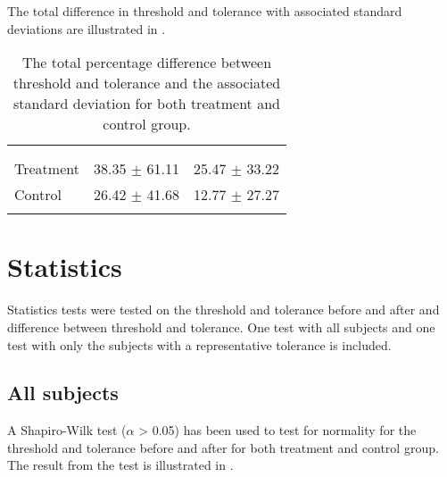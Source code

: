 The total difference in threshold and tolerance with associated standard deviations are illustrated in . 

\begin{longtable} {l|c|c}
 \rowcolor[HTML]{C0C0C0} 
  \color[HTML]{000000}{} & 
\color[HTML]{000000}{\textbf{Threshold}} & \color[HTML]{000000}{\textbf{Tolerance}} 	\\  \rule{0pt}{3ex} 
\cellcolor[HTML]{C0C0C0}{} &
 \cellcolor[HTML]{C0C0C0}{Difference [\%]} &  \cellcolor[HTML]{C0C0C0}{Difference [\%]} \\ \hline
Treatment & 38.35 $\pm$ 61.11 & 25.47 $\pm$ 33.22 \\ \hline
Control & 26.42 $\pm$ 41.68 & 12.77 $\pm$ 27.27 \\ \hline
	\caption{The total percentage difference between threshold and tolerance and the associated standard deviation for both treatment and control group.}
	\label{tab:Total}
\end{longtable}
\vspace{-.5cm}


\section{Statistics}
Statistics tests were tested on the threshold and tolerance before and after and difference between threshold and tolerance. One test with all subjects and one test with only the subjects with a representative tolerance is included.

\subsection{All subjects}
A Shapiro-Wilk test ($\alpha$ > 0.05) has been used to test for normality for the threshold and tolerance before and after for both treatment and control group. The result from the test is illustrated in .

